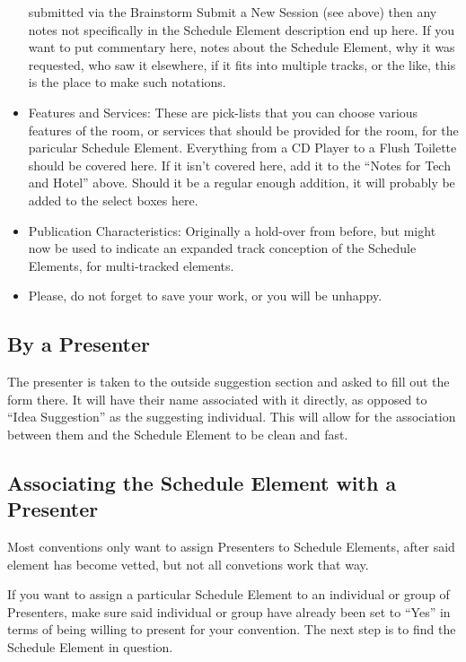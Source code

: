 \documentclass[tablesignature]{scrartcl}
\begin{document}
\begin{itemize}
     submitted via the Brainstorm Submit a New Session (see above) then
     any notes not specifically in the Schedule Element description
     end up here.  If you want to put commentary here, notes about the
     Schedule Element, why it was requested, who saw it elsewhere, if
     it fits into multiple tracks, or the like, this is the place to
     make such notations.
\item Features and Services: These are pick-lists that you can choose
     various features of the room, or services that should be provided
     for the room, for the paricular Schedule Element.  Everything
     from a CD Player to a Flush Toilette should be covered here.  If
     it isn't covered here, add it to the ``Notes for Tech and Hotel''
     above. Should it be a regular enough addition, it will probably
     be added to the select boxes here.
\item Publication Characteristics: Originally a hold-over from before,
     but might now be used to indicate an expanded track conception of
     the Schedule Elements, for multi-tracked elements.
\item Please, do not forget to save your work, or you will be unhappy.
\end{itemize}
\subsection{By a Presenter}
\label{sec-5_3}

   
   The presenter is taken to the outside suggestion section and asked
   to fill out the form there.  It will have their name associated
   with it directly, as opposed to ``Idea Suggestion'' as the suggesting
   individual.  This will allow for the association between them and
   the Schedule Element to be clean and fast.
\subsection{Associating the Schedule Element with a Presenter}
\label{sec-5_4}


   Most conventions only want to assign Presenters to Schedule
   Elements, after said element has become vetted, but not all
   convetions work that way.

   If you want to assign a particular Schedule Element to an
   individual or group of Presenters, make sure said individual or
   group have already been set to ``Yes'' in terms of being willing to
   present for your convention.  The next step is to find the Schedule
   Element in question.
\end{document}
